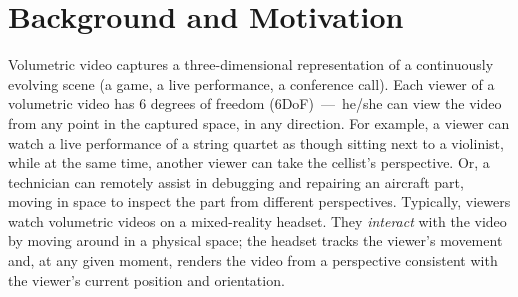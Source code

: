 \section{Background and Motivation}
\label{s:background}


%
Volumetric video captures a three-dimensional representation of a continuously evolving scene (\eg a game, a live performance, a conference call).
%
Each viewer of a volumetric video has 6 degrees of freedom (6DoF)~---~he/she can view the video from any point in the captured space, in any direction.
%
For example, a viewer can watch a live performance of a string quartet as though sitting next to a violinist, while at the same time, another viewer can take the cellist's perspective.
%
Or, a technician can remotely assist in debugging and repairing an aircraft part, moving in space to inspect the part from different perspectives.
%
Typically, viewers watch volumetric videos on a mixed-reality headset.
%
They \emph{interact} with the video by moving around in a physical space; the headset tracks the viewer's movement and, at any given moment, renders the video from a perspective consistent with the viewer's current position and orientation.
%
%
